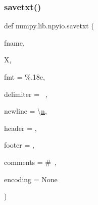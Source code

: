 \subsubsection{\texorpdfstring{savetxt()}{savetxt()}}
{\footnotesize\ttfamily def numpy.\+lib.\+npyio.\+savetxt (\begin{DoxyParamCaption}\item[{}]{fname,  }\item[{}]{X,  }\item[{}]{fmt = {\ttfamily \textquotesingle{}\%.18e\textquotesingle{}},  }\item[{}]{delimiter = {\ttfamily \textquotesingle{}~\textquotesingle{}},  }\item[{}]{newline = {\ttfamily \textquotesingle{}\textbackslash{}\hyperlink{namespacenumpy_a352663c52853d2754274407d5cae2832}{n}\textquotesingle{}},  }\item[{}]{header = {\ttfamily \textquotesingle{}\textquotesingle{}},  }\item[{}]{footer = {\ttfamily \textquotesingle{}\textquotesingle{}},  }\item[{}]{comments = {\ttfamily \textquotesingle{}\#~\textquotesingle{}},  }\item[{}]{encoding = {\ttfamily None} }\end{DoxyParamCaption})}

